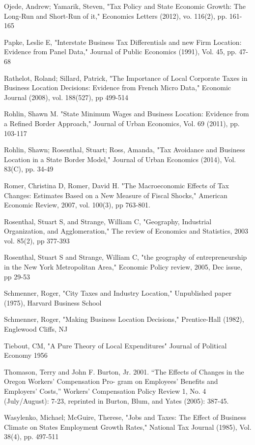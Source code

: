 \documentclass[12pt,a4paper]{article}
\begin{document}
\begin{thebibliography}{99}
Ojede, Andrew; Yamarik, Steven, "Tax Policy and State Economic Growth: The Long-Run and Short-Run of it," Economics Letters (2012), vo. 116(2), pp. 161-165

Papke, Leslie E, "Interstate Business Tax Differentials and new Firm Location: Evidence from Panel Data," Journal of Public Economics (1991), Vol. 45, pp. 47-68

Rathelot, Roland; Sillard, Patrick, "The Importance of Local Corporate Taxes in Business Location Decisions: Evidence from French Micro Data," Economic Journal (2008), vol. 188(527), pp 499-514

Rohlin, Shawn M. "State Minimum Wages and Business Location: Evidence from a Refined Border Approach," Journal of Urban Economics, Vol. 69 (2011), pp. 103-117

Rohlin, Shawn; Rosenthal, Stuart; Ross, Amanda, "Tax Avoidance and Business Location in a State Border Model," Journal of Urban Economics (2014), Vol. 83(C), pp. 34-49

Romer, Christina D, Romer, David H. "The Macroeconomic Effects of Tax Changes: Estimates Based on a New Measure of Fiscal Shocks," American Economic Review, 2007, vol. 100(3), pp 763-801.

Rosenthal, Stuart S, and Strange, William C, "Geography, Industrial Organization, and Agglomeration," The review of Economics and Statistics, 2003 vol. 85(2), pp 377-393

Rosenthal, Stuart S and Strange, William C, "the geography of entrepreneurship in the New York Metropolitan Area," Economic Policy review, 2005, Dec issue, pp 29-53

Schmenner, Roger, "City Taxes and Industry Location," Unpublished paper (1975), Harvard Business School

Schmenner, Roger, "Making Business Location Decisions," Prentice-Hall (1982), Englewood Cliffs, NJ

Tiebout, CM, "A Pure Theory of Local Expenditures" Journal of Political Economy 1956

Thomason, Terry and John F. Burton, Jr. 2001. “The Effects of Changes in the Oregon Workers’ Compensation Pro-
gram on Employees’ Benefits and Employers’ Costs,” Workers’ Compensation Policy Review 1, No. 4 (July/August): 7-23, reprinted in Burton, Blum, and Yates (2005): 387-45. 

Wasylenko, Michael; McGuire, Therese, "Jobs and Taxes: The Effect of Business Climate on States Employment Growth Rates," National Tax Journal (1985), Vol. 38(4), pp. 497-511
\end{thebibliography}
\end{document}
